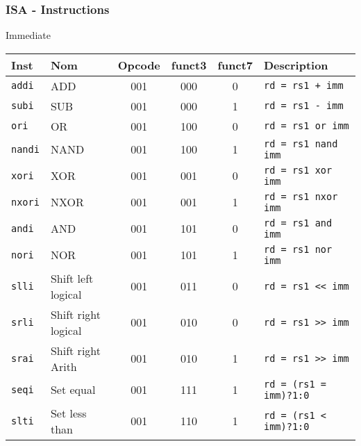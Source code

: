 \documentclass[xcolor=pst,10pt,onlymath]{beamer}
\begin{document}
\begin{frame}
    \frametitle{ISA - Instructions}
    Immediate
    \begin{longtable}{|l|l|c|c|c|l|}
        \hline
        Inst           & Nom                             & Opcode & funct3 & funct7 & Description                   \\
        \hline
        \texttt{addi}  & ADD                  & 001    & 000    & 0      & \texttt{rd = rs1 + imm}       \\
        \texttt{subi}  & SUB                  & 001    & 000    & 1      & \texttt{rd = rs1 - imm}       \\
        \texttt{ori}   & OR                   & 001    & 100    & 0      & \texttt{rd = rs1 or imm}      \\
        \texttt{nandi} & NAND                 & 001    & 100    & 1      & \texttt{rd = rs1 nand imm}    \\
        \texttt{xori}  & XOR                  & 001    & 001    & 0      & \texttt{rd = rs1 xor imm}     \\
        \texttt{nxori} & NXOR                 & 001    & 001    & 1      & \texttt{rd = rs1 nxor imm}    \\
        \texttt{andi}  & AND                  & 001    & 101    & 0      & \texttt{rd = rs1 and imm}     \\
        \texttt{nori}  & NOR                  & 001    & 101    & 1      & \texttt{rd = rs1 nor imm}     \\
        \texttt{slli}  & Shift left logical   & 001    & 011    & 0      & \texttt{rd = rs1 << imm}      \\
        \texttt{srli}  & Shift right logical  & 001    & 010    & 0      & \texttt{rd = rs1 >> imm}      \\
        \texttt{srai}  & Shift right Arith    & 001    & 010    & 1      & \texttt{rd = rs1 >> imm}      \\
        \texttt{seqi}  & Set equal            & 001    & 111    & 1      & \texttt{rd = (rs1 = imm)?1:0} \\
        \texttt{slti}  & Set less than        & 001    & 110    & 1      & \texttt{rd = (rs1 < imm)?1:0} \\
        \hline
    \end{longtable}
\end{frame}
\end{document}
